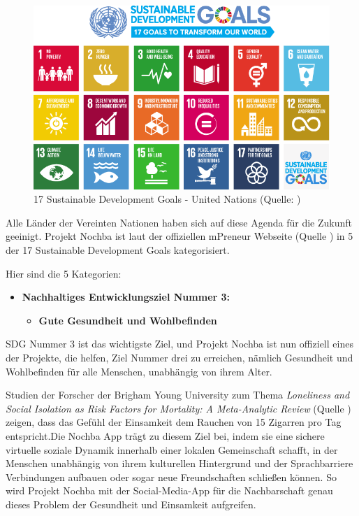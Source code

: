 \begin{figure}[H]
    \centering
    \includegraphics[width=1\textwidth]{pics/SDG-17goals.png}
    \caption{17 Sustainable Development Goals - United Nations (Quelle: \cite{un-sdgs})}
    \label{fig:SDG17goals}
\end{figure}

Alle Länder der Vereinten Nationen haben sich auf diese Agenda für die Zukunft geeinigt. Projekt Nochba ist laut der offiziellen mPreneur Webseite (Quelle \cite{mPreneur-Website}) in 5 der 17 Sustainable Development Goals kategorisiert.

Hier sind die 5 Kategorien:

\begin{itemize}
    \item \textbf{Nachhaltiges Entwicklungsziel Nummer 3:}
          \begin{itemize}
              \item \textbf{Gute Gesundheit und Wohlbefinden}
          \end{itemize}
\end{itemize}

SDG Nummer 3 ist das wichtigste Ziel, und Projekt Nochba ist nun offiziell eines der Projekte, die helfen, Ziel Nummer drei zu erreichen, nämlich Gesundheit und Wohlbefinden für alle Menschen, unabhängig von ihrem Alter.

Studien der Forscher der Brigham Young University zum Thema \textit{Loneliness and Social Isolation as Risk Factors for Mortality: A Meta-Analytic Review} (Quelle \cite{Loneliness-and-Social-Isolation}) zeigen, dass das Gefühl der Einsamkeit dem Rauchen von 15 Zigarren pro Tag entspricht.Die Nochba App trägt zu diesem Ziel bei, indem sie eine sichere virtuelle soziale Dynamik innerhalb einer lokalen Gemeinschaft schafft, in der Menschen unabhängig von ihrem kulturellen Hintergrund und der Sprachbarriere Verbindungen aufbauen oder sogar neue Freundschaften schließen können. So wird Projekt Nochba mit der Social-Media-App für die Nachbarschaft genau dieses Problem der Gesundheit und Einsamkeit aufgreifen.

